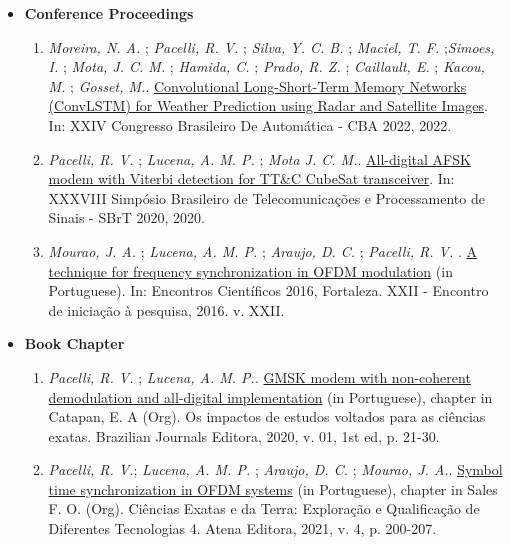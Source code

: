 \begin{itemize}[leftmargin=0.15in, label={}]
\begin{enumerate}[label=\textbf{J\arabic*.}, align=left, leftmargin=1.5cm]
    \end{enumerate}
    \item \textbf{Conference Proceedings}
    \begin{enumerate}[label=\textbf{C\arabic*.}, align=left, leftmargin=1.5cm]
        \item \textit{Moreira, N. A.} ; \textit{Pacelli, R. V.} ; \textit{Silva, Y. C. B.} ; \textit{Maciel, T. F.} ;\textit{Simoes, I.} ; \textit{Mota, J. C. M.} ; \textit{Hamida, C.} ; \textit{Prado, R. Z.} ; \textit{Caillault, E.} ; \textit{Kacou, M.} ; \textit{Gosset, M.}. \href{}{Convolutional Long-Short-Term Memory Networks (ConvLSTM) for Weather Prediction using Radar and Satellite Images}. In: XXIV Congresso Brasileiro De Automática - CBA 2022, 2022.
        \item \textit{Pacelli, R. V.} ; \textit{Lucena, A. M. P.} ; \textit{Mota J. C. M.}. \href{http://www.sbrt.org.br/sbrt2020/papers/1570654898.pdf}{All-digital AFSK modem with Viterbi detection for TT\&C CubeSat transceiver}. In: XXXVIII Simpósio Brasileiro de Telecomunicações e Processamento de Sinais - SBrT 2020, 2020.
        \item \textit{Mourao, J. A.} ; \textit{Lucena, A. M. P.} ; \textit{Araujo, D. C.} ; \textit{Pacelli, R. V.} . \href{https://uol.unifor.br/oul/conteudosite/?cdConteudo=6946081}{A technique for frequency synchronization in OFDM modulation} (in Portuguese). In: Encontros Científicos 2016, Fortaleza. XXII - Encontro de iniciação à pesquisa, 2016. v. XXII.
    \end{enumerate}
    \item \textbf{Book Chapter}
    \begin{enumerate}[label=\textbf{BC\arabic*.}, align=left, leftmargin=1.5cm]
        \item \textit{Pacelli, R. V.} ; \textit{Lucena, A. M. P.}. \href{https://www.brazilianjournals.com.br/assets/ebooks/2c9747ceb79e967166c7d80a9ff8e1da.pdf}{GMSK modem with non-coherent demodulation and all-digital implementation} (in Portuguese), chapter in Catapan, E. A (Org). Os impactos de estudos voltados para as ciências exatas. Brazilian Journals Editora, 2020, v. 01, 1st ed, p. 21-30.
        \item \textit{Pacelli, R. V.}; \textit{Lucena, A. M. P.} ; \textit{Araujo, D. C.} ; \textit{Mourao, J. A.}. \href{https://www.finersistemas.com/atenaeditora/index.php/admin/api/ebookPDF/3771}{Symbol time synchronization in OFDM systems} (in Portuguese), chapter in Sales F. O. (Org). Ciências Exatas e da Terra: Exploração e Qualificação de Diferentes Tecnologias 4. Atena Editora, 2021, v. 4, p. 200-207.
    \end{enumerate}
\end{itemize}